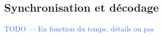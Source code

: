\documentclass[../main.tex]{subfiles}
\begin{document}
\subsection{Synchronisation et décodage}

\begin{frame}{\subsecname}
  \begin{center}
    \textcolor{RoyalBlue}{TODO --- En fonction du temps, détails ou pas}
  \end{center}
\end{frame}


\end{document}
